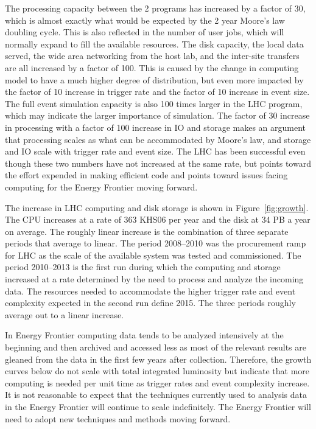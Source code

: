 The processing capacity between the 2 programs has increased by a
factor of 30, which is almost exactly what would be expected by the 2
year Moore's law doubling cycle.  This is also reflected in the number
of user jobs, which will normally expand to fill the available
resources.  The disk capacity, the local data served, the wide area
networking from the host lab, and the inter-site transfers are all
increased by a factor of 100.  This is caused by the change in
computing model to have a much higher degree of distribution, but even
more impacted by the factor of 10 increase in trigger rate and the
factor of 10 increase in event size.  The full event simulation
capacity is also 100 times larger in the LHC program, which may
indicate the larger importance of simulation.  The factor of 30
increase in processing with a factor of 100 increase in IO and storage
makes an argument that processing scales as what can be accommodated
by Moore's law, and storage and IO scale with trigger rate and event
size.  The LHC has been successful even though these two numbers have
not increased at the same rate, but points toward the effort expended
in making efficient code and points toward issues facing computing for
the Energy Frontier moving forward.

The increase in LHC computing and disk storage is shown in
Figure~\ref{fig:growth}.  The CPU increases at a rate of 363 KHS06 per
year and the disk at 34 PB a year on average.  The roughly linear
increase is the combination of three separate periods that average to
linear.  The period 2008--2010 was the procurement ramp for
LHC as the scale of the available system was tested and commissioned.
The period 2010--2013 is the first run during which the computing and
storage increased at a rate determined by the need to process
and analyze the incoming data.  
The resources needed to accommodate the higher trigger
rate and event complexity expected in the second run define 2015.  The
three periods roughly average out to a linear increase.

In Energy Frontier computing data tends to be analyzed intensively at
the beginning and then archived and accessed less as most of the
relevant results are gleaned from the data in the first few years
after collection.  Therefore, the growth curves below do not scale
with total integrated luminosity but indicate that more computing is
needed per unit time as trigger rates and event complexity increase.
It is not reasonable to expect that the techniques currently used to
analysis data in the Energy Frontier will continue to scale
indefinitely.  The Energy Frontier will need to adopt new techniques
and methods moving forward.

